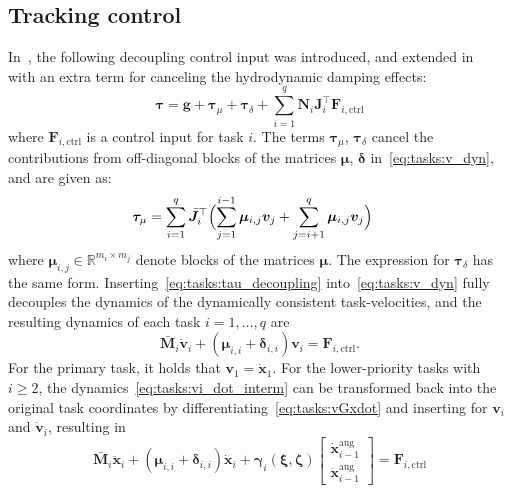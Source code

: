 \documentclass[../main.tex]{subfiles}
\begin{document}
\subsection{Tracking control}\label{sec:tasks:tracking}
In~\cite{Dietrich2020}, the following decoupling control input was introduced, and extended in~\cite{Saeboe2022} with an extra term for canceling the hydrodynamic damping effects:
\begin{equation}\label{eq:tasks:tau_decoupling}
    \bm{\tau} = \bm{g} + \bm{\tau}_{\mu} + \bm{\tau}_{\delta} + \sum_{i=1}^{q} \bm{N}_i \bm{J}^\top_i \bm{F}_{i,\textrm{ctrl}}
\end{equation}
where $\bm{F}_{i,\textrm{ctrl}}$ is a control input for task $i$. The terms $\bm{\tau}_{\mu}$, $\bm{\tau}_{\delta}$ cancel the contributions from off-diagonal blocks of the matrices $\bm{\mu}$, $\bm{\delta}$ in~\eqref{eq:tasks:v_dyn}, and are given as:
    \begin{align}
        \label{eq:tasks:tau_mu}
        \bm{\tau}_{\mu} &= \sum^{q}_{i=1} \bar{\bm{J}}_i^\top \Bigl( \sum_{j=1}^{i-1} \bm{\mu}_{i,j} \bm{v}_j + \sum_{j=i+1}^{q} \bm{\mu}_{i,j} \bm{v}_j   \Bigr)
    \end{align}
where $\bm{\mu}_{i,j}\in \mathbb{R}^{m_i \times m_j}$ denote blocks of the matrices $\bm{\mu}$. The expression for $\bm{\tau}_\delta$ has the same form.
Inserting~\eqref{eq:tasks:tau_decoupling} into~\eqref{eq:tasks:v_dyn} fully decouples the dynamics of the dynamically consistent task-velocities, and the resulting dynamics of each task $i=1,\ldots,q$ are
\begin{equation}\label{eq:tasks:vi_dot_interm}
    \bar{\bm{M}}_i \dot{\bm{v}}_i + \left( \bm{\mu}_{i,i} + \bm{\delta}_{i,i} \right) \bm{v}_i = \bm{F}_{i,\textrm{ctrl}} .
\end{equation}
For the primary task, it holds that $\bm{v}_1 = \dot{\bm{x}}_1$. For the lower-priority tasks with $i \geq 2$, the dynamics~\eqref{eq:tasks:vi_dot_interm} can be transformed back into the original task coordinates by differentiating~\eqref{eq:tasks:vGxdot} and inserting for $\bm{v}_i$ and $\dot{\bm{v}}_i$, resulting in
\begin{equation}\label{eq:tasks:x_i_ddot}
    \bar{\bm{M}}_i \ddot{\bm{x}}_i + \left( \bm{\mu}_{i,i} + \bm{\delta}_{i,i} \right) \dot{\bm{x}}_i + \bm{\gamma}_i (\bm{\xi}, \bm{\zeta}) \begin{bmatrix}
        \dot{\bm{x}}^{\textrm{aug}}_{i-1} \\ \ddot{\bm{x}}^{\textrm{aug}}_{i-1}
    \end{bmatrix} = \bm{F}_{i,\textrm{ctrl}}
\end{equation}
\end{document}
